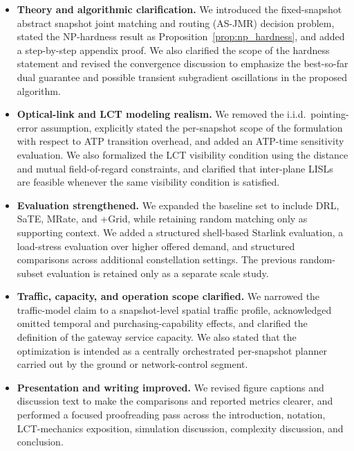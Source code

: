 \documentclass[journal,12pt,onecolumn,draftclsnofoot,]{IEEEtran}
\begin{document}
\begin{itemize}

\item \textbf{Theory and algorithmic clarification.} We introduced the fixed-snapshot abstract snapshot joint matching and routing (AS-JMR) decision problem, stated the NP-hardness result as Proposition~\ref{prop:np_hardness}, and added a step-by-step appendix proof. We also clarified the scope of the hardness statement and revised the convergence discussion to emphasize the best-so-far dual guarantee and possible transient subgradient oscillations in the proposed algorithm.

\item \textbf{Optical-link and LCT modeling realism.} We removed the i.i.d.\ pointing-error assumption, explicitly stated the per-snapshot scope of the formulation with respect to ATP transition overhead, and added an ATP-time sensitivity evaluation. We also formalized the LCT visibility condition using the distance and mutual field-of-regard constraints, and clarified that inter-plane LISLs are feasible whenever the same visibility condition is satisfied.

\item \textbf{Evaluation strengthened.} We expanded the baseline set to include DRL, SaTE, MRate, and +Grid, while retaining random matching only as supporting context. We added a structured shell-based Starlink evaluation, a load-stress evaluation over higher offered demand, and structured comparisons across additional constellation settings. The previous random-subset evaluation is retained only as a separate scale study.

\item \textbf{Traffic, capacity, and operation scope clarified.} We narrowed the traffic-model claim to a snapshot-level spatial traffic profile, acknowledged omitted temporal and purchasing-capability effects, and clarified the definition of the gateway service capacity. We also stated that the optimization is intended as a centrally orchestrated per-snapshot planner carried out by the ground or network-control segment.

\item \textbf{Presentation and writing improved.} We revised figure captions and discussion text to make the comparisons and reported metrics clearer, and performed a focused proofreading pass across the introduction, notation, LCT-mechanics exposition, simulation discussion, complexity discussion, and conclusion.
\end{itemize}
\end{document}
